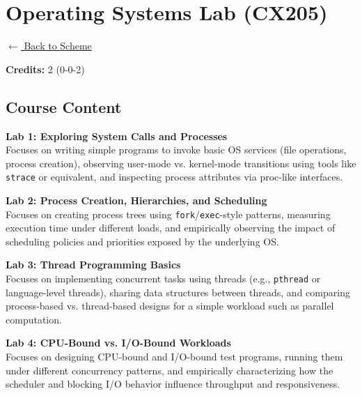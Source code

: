 \section*{Operating Systems Lab (CX205)}
\label{course:CX205}

\noindent \small{\hyperref[main:scheme]{$\leftarrow$ Back to Scheme}} \vspace{0.5cm}

\noindent \textbf{Credits:} 2 (0-0-2)

\subsection*{Course Content}
\noindent\textbf{Lab 1: Exploring System Calls and Processes} \\
Focuses on writing simple programs to invoke basic OS services (file operations, process creation), observing user-mode vs. kernel-mode transitions using tools like \texttt{strace} or equivalent, and inspecting process attributes via proc-like interfaces. \\

\vspace{0.2cm}

\noindent\textbf{Lab 2: Process Creation, Hierarchies, and Scheduling} \\
Focuses on creating process trees using \texttt{fork}/\texttt{exec}-style patterns, measuring execution time under different loads, and empirically observing the impact of scheduling policies and priorities exposed by the underlying OS. \\

\vspace{0.2cm}

\noindent\textbf{Lab 3: Thread Programming Basics} \\
Focuses on implementing concurrent tasks using threads (e.g., \texttt{pthread} or language-level threads), sharing data structures between threads, and comparing process-based vs. thread-based designs for a simple workload such as parallel computation. \\

\vspace{0.2cm}

\noindent\textbf{Lab 4: CPU-Bound vs. I/O-Bound Workloads} \\
Focuses on designing CPU-bound and I/O-bound test programs, running them under different concurrency patterns, and empirically characterizing how the scheduler and blocking I/O behavior influence throughput and responsiveness. \\

